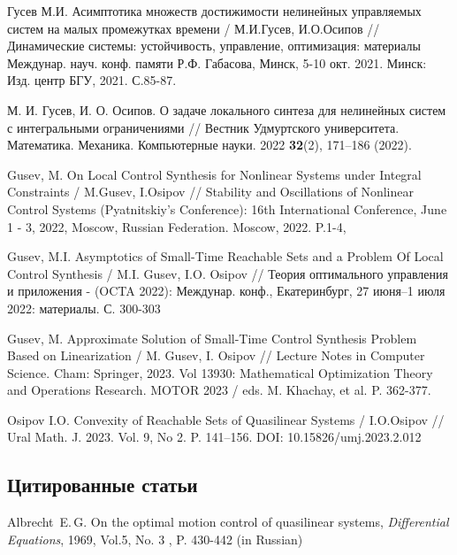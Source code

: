 \documentclass[../main.tex]{subfiles}
\begin{document}
\begin{thebibliography}{99}
    Гусев М.И. Асимптотика множеств достижимости нелинейных управляемых систем на малых промежутках времени / М.И.Гусев, И.О.Осипов // Динамические системы: устойчивость, управление, оптимизация: материалы Междунар. науч. конф. памяти Р.Ф. Габасова, Минск, 5-10 окт. 2021. Минск: Изд. центр БГУ, 2021. С.85-87. 

    М. И. Гусев, И. О. Осипов.
    О задаче локального синтеза для нелинейных систем с интегральными ограничениями // 
    Вестник Удмуртского университета. Математика. Механика. Компьютерные науки. 2022
    \textbf{32}(2), 171–186 (2022).

    Gusev, M. 
    On Local Control Synthesis for Nonlinear Systems under Integral Constraints / 
    M.Gusev, I.Osipov // 
    Stability and Oscillations of Nonlinear Control Systems (Pyatnitskiy's Conference): 
    16th International Conference, 
    June 1 - 3, 2022, Moscow, Russian Federation. Moscow, 
    2022. P.1-4, 

    Gusev, M.I. 
    Asymptotics of Small-Time Reachable Sets and a Problem Of Local Control Synthesis / 
    M.I. Gusev, I.O. Osipov // 
    Теория оптимального управления и приложения - (OCTA 2022): 
    Междунар. конф., Екатеринбург, 27 июня–1 июля 2022: 
    материалы. С. 300-303

    Gusev, M. 
    Approximate Solution of Small-Time Control Synthesis Problem Based on Linearization / 
    M. Gusev, I. Osipov // 
    Lecture Notes in Computer Science. Cham: Springer, 
    2023. Vol 13930: 
    Mathematical Optimization Theory and Operations Research. 
    MOTOR 2023 / eds. M. Khachay, et al.
     P. 362-377.

    Osipov I.O. 
    Convexity of Reachable Sets of Quasilinear Systems /
    I.O.Osipov // 
    Ural Math. J. 
    2023. Vol. 9, No 2. P. 141–156. 
    DOI: 10.15826/umj.2023.2.012


\subsection*{Цитированные статьи}

Albrecht~E.\,G. On the optimal motion control of quasilinear systems, \emph{Differential Equations}, 1969, Vol.5, No. 3 , P. 430-442 (in Russian)


\end{thebibliography}
\end{document}
